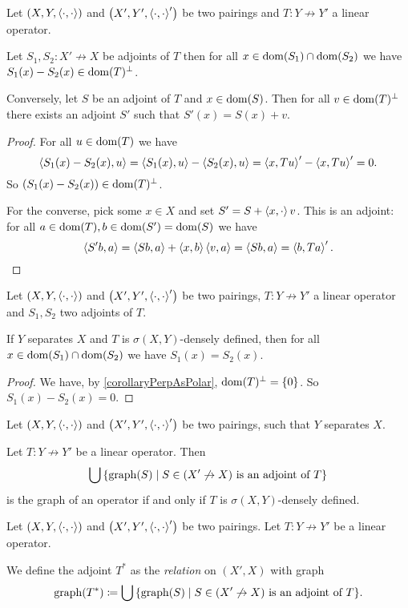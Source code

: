 \begin{lemma}
Let $\sSet{X,Y,\pair{\cdot,\cdot}}$ and $\sSet{X',Y',\pair{\cdot,\cdot}'}$ be two pairings and $T: Y\not\to Y'$ a linear operator.

Let $S_1, S_2: X'\not\to X$ be adjoints of $T$ then for all $x\in \operatorname{dom}(S_1)\cap\operatorname{dom}(S_2)$ we have $S_1(x) - S_2(x) \in \operatorname{dom}(T)^\perp$.

Conversely, let $S$ be an adjoint of $T$ and $x\in\operatorname{dom}(S)$. Then for all $v\in \operatorname{dom}(T)^\perp$ there exists an adjoint $S'$ such that $S'(x) = S(x) + v$.
\end{lemma}
\begin{proof}
For all $u\in \operatorname{dom}(T)$ we have
\[ \left\langle S_1(x) - S_2(x), u \right\rangle = \left\langle S_1(x), u \right\rangle - \left\langle S_2(x), u \right\rangle = \left\langle x, Tu \right\rangle' - \left\langle x, Tu \right\rangle' = 0. \]
So $(S_1(x) - S_2(x)) \in \operatorname{dom}(T)^\perp$.

For the converse, pick some $x\in X$ and set $S' = S + \left\langle x,\cdot \right\rangle v$. This is an adjoint: for all $a\in \operatorname{dom}(T), b\in \operatorname{dom}(S') = \operatorname{dom}(S)$ we have
\[  \left\langle S'b,a \right\rangle = \left\langle Sb, a \right\rangle + \left\langle x,b \right\rangle\left\langle v,a \right\rangle = \left\langle Sb, a \right\rangle = \left\langle b,Ta \right\rangle'. \]
\end{proof}
\begin{corollary}
Let $\sSet{X,Y,\pair{\cdot,\cdot}}$ and $\sSet{X',Y',\pair{\cdot,\cdot}'}$ be two pairings, $T: Y\not\to Y'$ a linear operator and $S_1, S_2$ two adjoints of $T$.

If $Y$ separates $X$ and $T$ is $\sigma(X,Y)$-densely defined, then for all $x\in \operatorname{dom}(S_1)\cap\operatorname{dom}(S_2)$ we have $S_1(x) = S_2(x)$.
\end{corollary}
\begin{proof}
We have, by \ref{corollaryPerpAsPolar}, $\operatorname{dom}(T)^\perp = \{0\}$. So $S_1(x) - S_2(x) = 0$.
\end{proof}
\begin{corollary}
Let $\sSet{X,Y,\pair{\cdot,\cdot}}$ and $\sSet{X',Y',\pair{\cdot,\cdot}'}$ be two pairings, such that $Y$ separates $X$.

Let $T: Y\not\to Y'$ be a linear operator. Then
\[ \bigcup\setbuilder{\graph(S)}{\text{$S\in (X'\not\to X)$ is an adjoint of $T$}} \]
is the graph of an operator \textup{if and only if} $T$ is $\sigma(X,Y)$-densely defined.
\end{corollary}

\begin{definition}
Let $\sSet{X,Y,\pair{\cdot,\cdot}}$ and $\sSet{X',Y',\pair{\cdot,\cdot}'}$ be two pairings. Let $T: Y\not\to Y'$ be a linear operator.

We define the adjoint $T^*$ as the \emph{relation} on $(X',X)$ with graph
\[ \graph(T^*) \defeq \bigcup\setbuilder{\graph(S)}{\text{$S\in (X'\not\to X)$ is an adjoint of $T$}}. \]
\end{definition}

